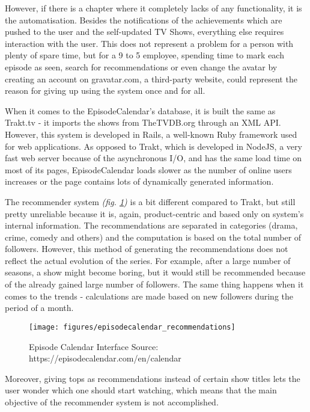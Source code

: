 However, if there is a chapter where it completely lacks of any functionality, it is the automatisation. Besides the notifications of the achievements which are pushed to the user and the self-updated TV Shows, everything else requires interaction with the user. This does not represent a problem for a person with plenty of spare time, but for a 9 to 5 employee, spending time to mark each episode as seen, search for recommendations or even change the avatar by creating an account on gravatar.com, a third-party website, could represent the reason for giving up using the system once and for all.

When it comes to the EpisodeCalendar's database, it is built the same as Trakt.tv - it imports the shows from TheTVDB.org through an XML API. However, this system is developed in Rails, a well-known Ruby framework used for web applications. As opposed to Trakt, which is developed in NodeJS, a very fast web server because of the asynchronous I/O, and has the same load time on most of its pages, EpisodeCalendar loads slower as the number of online users increases or the page contains lots of dynamically generated information.

The recommender system \textit{(fig. \ref{fig:episodecalendarrecommendations})} is a bit different compared to Trakt, but still pretty unreliable because it is, again, product-centric and based only on system's internal information. The recommendations are separated in categories (drama, crime, comedy and others) and the computation is based on the total number of followers. However, this method of generating the recommendations does not reflect the actual evolution of the series. For example, after a large number of seasons, a show might become boring, but it would still be recommended because of the already gained large number of followers. The same thing happens when it comes to the trends - calculations are made based on new followers during the period of a month.

\begin{figure}[h]
\centering
\texttt{[image: figures/episodecalendar\_recommendations]}
\caption{Episode Calendar Interface \newline Source: https://episodecalendar.com/en/calendar}
\label{fig:episodecalendarrecommendations}
\end{figure}

Moreover, giving tops as recommendations instead of certain show titles lets the user wonder which one should start watching, which means that the main objective of the recommender system is not accomplished.

